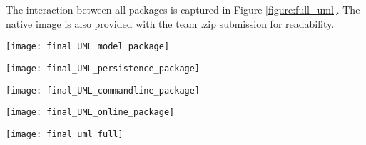 The interaction between all packages is captured in Figure \ref{figure:full_uml}. 
The native image is also provided with the team .zip submission for readability.

\newpage
\begin{center}
	\texttt{[image: final\_UML\_model\_package]}
	\label{figure:model_uml}
\end{center}

\begin{center}
	\texttt{[image: final\_UML\_persistence\_package]}
	\label{figure:persistence_uml}
\end{center}

\begin{center}
	\texttt{[image: final\_UML\_commandline\_package]}
	\label{figure:commandline_uml}
\end{center}

\begin{center}
	\texttt{[image: final\_UML\_online\_package]}
	\label{figure:online_uml}
\end{center}

\begin{center}
	\texttt{[image: final\_uml\_full]}
	\label{figure:full_uml}
\end{center}